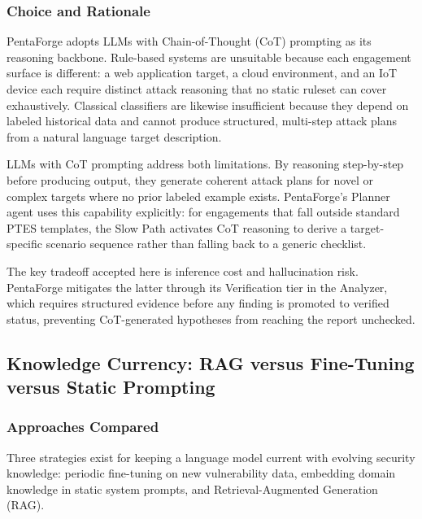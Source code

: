 \documentclass[12pt,a4paper]{report}
\begin{document}
\subsubsection{Choice and Rationale}

PentaForge adopts LLMs with Chain-of-Thought (CoT) prompting as its
reasoning backbone. Rule-based systems are unsuitable because each
engagement surface is different: a web application target, a cloud
environment, and an IoT device each require distinct attack reasoning that
no static ruleset can cover exhaustively. Classical classifiers are likewise
insufficient because they depend on labeled historical data and cannot
produce structured, multi-step attack plans from a natural language target
description.

LLMs with CoT prompting address both limitations. By reasoning
step-by-step before producing output, they generate coherent attack plans
for novel or complex targets where no prior labeled example exists.
PentaForge's Planner agent uses this capability explicitly: for engagements
that fall outside standard PTES templates, the Slow Path activates CoT
reasoning to derive a target-specific scenario sequence rather than falling
back to a generic checklist.

The key tradeoff accepted here is inference cost and hallucination risk.
PentaForge mitigates the latter through its Verification tier in the
Analyzer, which requires structured evidence before any finding is promoted
to verified status, preventing CoT-generated hypotheses from reaching the
report unchecked.

\subsection{Knowledge Currency: RAG versus Fine-Tuning versus Static
Prompting}

\subsubsection{Approaches Compared}

Three strategies exist for keeping a language model current with evolving
security knowledge: periodic fine-tuning on new vulnerability data,
embedding domain knowledge in static system prompts, and
Retrieval-Augmented Generation (RAG).
\end{document}
